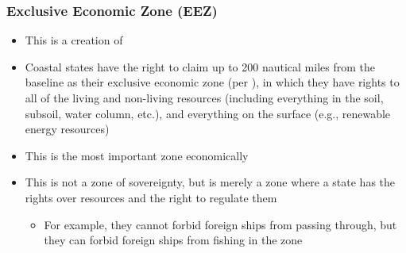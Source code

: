 \subsubsection{Exclusive Economic Zone (EEZ)}
\begin{itemize}
    \item This is a creation of 
    \item Coastal states have the right to claim up to 200 nautical miles from the baseline as their exclusive economic zone (per ), in which they have rights to all of the living and non-living resources (including everything in the soil, subsoil, water column, etc.), and everything on the surface (e.g., renewable energy resources)
    \item This is the most important zone economically
    \item This is not a zone of sovereignty, but is merely a zone where a state has the rights over resources and the right to regulate them
    \begin{itemize}
        \item For example, they cannot forbid foreign ships from passing through, but they can forbid foreign ships from fishing in the zone
    \end{itemize}
\end{itemize}

